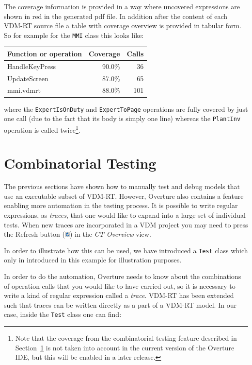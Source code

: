 The coverage information is provided in a way where uncovered
expressions are shown in red in the generated pdf file. In addition
after the content of each VDM-RT source file a table with coverage
overview is provided in tabular form. So for example for the
\texttt{MMI} class this looks like:

\begin{longtable}{|l|r|r|}
\hline
Function or operation & Coverage & Calls \\
\hline
\hline
HandleKeyPress & 90.0\% & 36 \\
\hline
UpdateScreen & 87.0\% & 65 \\
\hline
\hline
mmi.vdmrt & 88.0\% & 101 \\
\hline
\end{longtable}

\noindent where the \texttt{ExpertIsOnDuty} and \texttt{ExpertToPage}
operations are fully covered by just one call (due to the fact that
its body is simply one line) whereas the \texttt{PlantInv} operation
is called twice\footnote{Note that the coverage from the combinatorial
  testing feature described in Section~\ref{sec:CT} is not taken into
  account in the current version of the Overture IDE, but this will be
  enabled in a later release.}.

\section{Combinatorial Testing}\label{sec:CT}

The previous sections have shown how to manually test and debug models
that use an executable subset of VDM-RT. However, Overture also
contains a feature enabling more automation in the testing process. It
is possible to write regular expressions, as \emph{traces}, that one
would like to expand into a large set of individual tests. When new
traces are incorporated in a VDM project you may need to press the
\textsf{Refresh} button
(\includegraphics[width=0.02\textwidth]{figures/refresh}) in the
\emph{CT Overview} view.

In order to illustrate how this can be used, we have introduced a
\texttt{Test} class which only in introduced in this example for
illustration purposes.

In order to do the automation, Overture needs to know about the
combinations of operation calls that you would like to have carried
out, so it is necessary to write a kind of regular expression called a
\emph{trace}. VDM-RT has been extended such that traces can be written
directly as a part of a VDM-RT model. In our case, inside the \texttt{Test}
class one can find:

